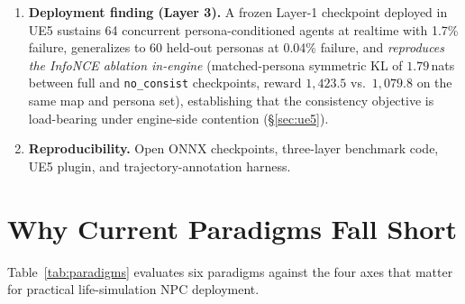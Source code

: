\documentclass[conference]{IEEEtran}
\begin{document}
\begin{enumerate}
    three while leaving (or inflating) pairwise action-KL
    (\S\ref{sec:meltingpot}). Retrieval over the full $12$-persona vocabulary
    remains $3.4$--$4.9\times$ chance top-1, and a CU $\to$ CH cross-substrate
    transfer of the persona projection and trajectory encoder retrieves at
    $1.79\times$ chance top-1 (\S\ref{sec:mp_transfer},
    Tab.~\ref{tab:mp_transfer}).
  \item \textbf{Deployment finding (Layer 3).} A frozen Layer-1 checkpoint
    deployed in UE5 sustains 64 concurrent persona-conditioned agents at
    realtime with 1.7\% failure, generalizes to 60 held-out personas at
    0.04\% failure, and \emph{reproduces the InfoNCE ablation in-engine}
    (matched-persona symmetric KL of $1.79$\,nats between full and
    \texttt{no\_consist} checkpoints, reward $1{,}423.5$ vs.\ $1{,}079.8$
    on the same map and persona set), establishing that the consistency
    objective is load-bearing under engine-side contention
    (\S\ref{sec:ue5}).
  \item \textbf{Reproducibility.} Open ONNX checkpoints, three-layer
    benchmark code, UE5 plugin, and trajectory-annotation harness.
\end{enumerate}

\section{Why Current Paradigms Fall Short}
\label{sec:paradigms}

Table~\ref{tab:paradigms} evaluates six paradigms against the four axes that
matter for practical life-simulation NPC deployment.
\end{document}
